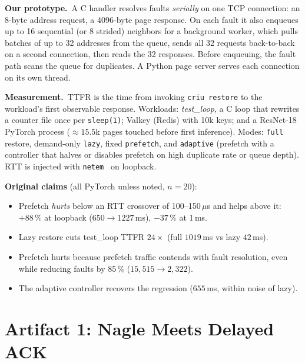 \documentclass[conference]{IEEEtran}
\newcommand{\us}{\,$\mu$s\xspace}
\begin{document}
\textbf{Our prototype.}\, A C handler resolves faults \emph{serially} on one
TCP connection: an 8-byte address request, a 4096-byte page response. On
each fault it also enqueues up to 16 sequential (or 8 strided) neighbors for a
background worker, which pulls batches of up to 32 addresses from the queue,
sends all 32 requests back-to-back on a second connection, then reads the 32
responses. Before enqueuing, the fault path scans the queue for duplicates. A
Python page server serves each connection on its own thread.

\textbf{Measurement.}\, TTFR is the time from invoking \texttt{criu restore} to
the workload's first observable response. Workloads: \emph{test\_loop}, a C
loop that rewrites a counter file once per \texttt{sleep(1)}; Valkey (Redis)
with 10k keys; and a ResNet-18 PyTorch process (${\approx}15.5$k pages touched
before first inference). Modes: \texttt{full} restore, demand-only
\texttt{lazy}, fixed \texttt{prefetch}, and \texttt{adaptive} (prefetch with a
controller that halves or disables prefetch on high duplicate rate or queue
depth). RTT is injected with \texttt{netem}~\cite{hemminger2005netem} on
loopback.

\textbf{Original claims} (all PyTorch unless noted, $n\!=\!20$):
\begin{itemize}
\item[C0] Prefetch \emph{hurts} below an RTT crossover of 100--150\us and helps
above it: $+88\,\%$ at loopback ($650\to1227$\,ms), $-37\,\%$ at 1\,ms.
\item[C1] Lazy restore cuts test\_loop TTFR $24\times$ (full $1019$\,ms vs
lazy $42$\,ms).
\item[C2] Prefetch hurts because prefetch traffic contends with fault
resolution, even while reducing faults by 85\,\% ($15{,}515\to2{,}322$).
\item[C3] The adaptive controller recovers the regression ($655$\,ms, within
noise of lazy).
\end{itemize}

\section{Artifact 1: Nagle Meets Delayed ACK}
\label{sec:nagle}
\end{document}
